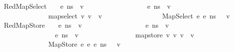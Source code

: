 \begin{isabellebody}
\ \ {\isacharbar}{\kern0pt}\ RedMapSelect{\isacharcolon}{\kern0pt}\ {\isachardoublequoteopen}{\isasymlbrakk}\ {\isasymLambda}{\isacharcomma}{\kern0pt}{\isasymGamma}{\isacharcomma}{\kern0pt}{\isasymOmega}\ {\isasymturnstile}\ {\isasymlangle}e{}{\isacharcomma}{\kern0pt}\ n{\isacharunderscore}{\kern0pt}s{\isasymrangle}\ {\isasymDown}\ v{}{\isacharsemicolon}{\kern0pt}\isanewline
\ \ \ \ \ \ \ \ \ \ \ \ \ \ \ \ {\isasymLambda}{\isacharcomma}{\kern0pt}{\isasymGamma}{\isacharcomma}{\kern0pt}{\isasymOmega}\ {\isasymturnstile}\ {\isasymlangle}e{}{\isacharcomma}{\kern0pt}\ n{\isacharunderscore}{\kern0pt}s{\isasymrangle}\ {\isasymDown}\ v{}{\isacharsemicolon}{\kern0pt}\isanewline
\ \ \ \ \ \ \ \ \ \ \ \ \ \ \ \ map{\isacharunderscore}{\kern0pt}select\ v{}\ v{}\ {\isacharequal}{\kern0pt}\ v{\isasymrbrakk}\ {\isasymLongrightarrow}\isanewline
\ \ \ \ \ \ \ \ \ \ \ \ \ {\isasymLambda}{\isacharcomma}{\kern0pt}{\isasymGamma}{\isacharcomma}{\kern0pt}{\isasymOmega}\ {\isasymturnstile}\ {\isasymlangle}\ MapSelect\ e{}\ e{}{\isacharcomma}{\kern0pt}\ n{\isacharunderscore}{\kern0pt}s\ {\isasymrangle}\ {\isasymDown}\ v{\isachardoublequoteclose}\isanewline
\ \ {\isacharbar}{\kern0pt}\ RedMapStore{\isacharcolon}{\kern0pt}\ {\isachardoublequoteopen}{\isasymlbrakk}\ {\isasymLambda}{\isacharcomma}{\kern0pt}{\isasymGamma}{\isacharcomma}{\kern0pt}{\isasymOmega}\ {\isasymturnstile}\ {\isasymlangle}e{}{\isacharcomma}{\kern0pt}\ n{\isacharunderscore}{\kern0pt}s{\isasymrangle}\ {\isasymDown}\ v{}{\isacharsemicolon}{\kern0pt}\isanewline
\ \ \ \ \ \ \ \ \ \ \ \ \ \ \ \ {\isasymLambda}{\isacharcomma}{\kern0pt}{\isasymGamma}{\isacharcomma}{\kern0pt}{\isasymOmega}\ {\isasymturnstile}\ {\isasymlangle}e{}{\isacharcomma}{\kern0pt}\ n{\isacharunderscore}{\kern0pt}s{\isasymrangle}\ {\isasymDown}\ v{}{\isacharsemicolon}{\kern0pt}\isanewline
\ \ \ \ \ \ \ \ \ \ \ \ \ \ \ \ {\isasymLambda}{\isacharcomma}{\kern0pt}{\isasymGamma}{\isacharcomma}{\kern0pt}{\isasymOmega}\ {\isasymturnstile}\ {\isasymlangle}e{}{\isacharcomma}{\kern0pt}\ n{\isacharunderscore}{\kern0pt}s{\isasymrangle}\ {\isasymDown}\ v{}{\isacharsemicolon}{\kern0pt}\isanewline
\ \ \ \ \ \ \ \ \ \ \ \ \ \ \ \ map{\isacharunderscore}{\kern0pt}store\ v{}\ v{}\ v{}\ {\isacharequal}{\kern0pt}\ v{\isasymrbrakk}\ {\isasymLongrightarrow}\isanewline
\ \ \ \ \ \ \ \ \ \ \ \ \ {\isasymLambda}{\isacharcomma}{\kern0pt}{\isasymGamma}{\isacharcomma}{\kern0pt}{\isasymOmega}\ {\isasymturnstile}\ {\isasymlangle}\ MapStore\ e{}\ e{}\ e{}{\isacharcomma}{\kern0pt}\ n{\isacharunderscore}{\kern0pt}s\ {\isasymrangle}\ {\isasymDown}\ v{\isachardoublequoteclose}\isanewline

\end{isabellebody}
